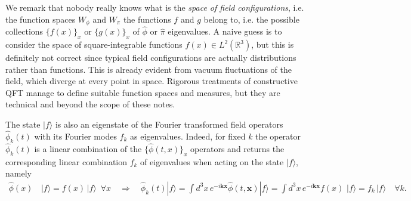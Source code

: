 \documentclass[../QFT_main.tex]{subfiles}
\begin{document}
\begin{mytheorem}
We remark that nobody really knows what is the \emph{space of field configurations}, i.e. the function spaces $W_\phi$ and $W_\pi$ the functions $f$ and $g$ belong to, i.e. the possible collections $\{f(x)\}_x$ or $\{g(x)\}_x$ of $\hat{\phi}$ or $\hat{\pi}$ eigenvalues.
A naive guess is to consider the space of square-integrable functions $f(x) \in L^2(\mathbb{R}^3)$, but this is definitely not correct since typical field configurations are actually distributions rather than functions.
This is already evident from vacuum fluctuations of the field, which diverge at every point in space.
Rigorous treatments of constructive QFT manage to define suitable function spaces and measures, but they are technical and beyond the scope of these notes.
%

The state $|f\rangle$ is also an eigenstate of the Fourier transformed field operators $\hat{\phi}_k(t)$ with its Fourier modes $f_k$ as eigenvalues.
Indeed, for fixed $k$ the operator $\hat{\phi}_k(t)$ is a linear combination of the $\{\hat{\phi}(t,x)\}_x$ operators and returns the corresponding linear combination $f_k$ of eigenvalues when acting on the state $|f\rangle$, namely
%
\begin{align}
    \hat{\phi}(x)&\,|f\rangle = f(x)\, |f\rangle \,\,\, \forall x\quad \Rightarrow\quad 
    \hat{\phi}_k(t)|f\rangle = \int d^3 x\, e^{-i \mathbf{k}\mathbf{x}} \hat{\phi}(t, \mathbf{x}) |f\rangle = \int d^3 x\, e^{-i \mathbf{k}\mathbf{x}} f(x) \,\,|f\rangle =
    f_k\,|f\rangle \quad \forall k.
\end{align}
%


\end{mytheorem}
\end{document}
